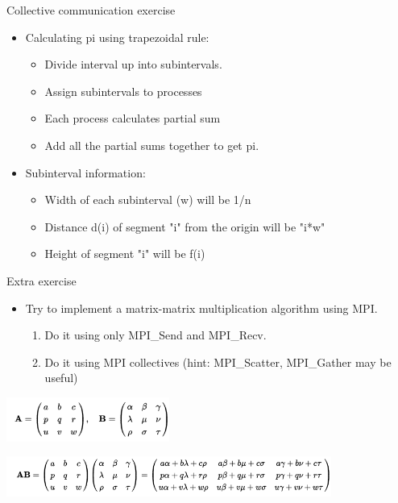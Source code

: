\begin{frame}[fragile]{Collective communication exercise}
\vspace{5mm}
\begin{itemize}
\item Calculating pi using trapezoidal rule:
    \begin{itemize}
    \item Divide interval up into subintervals.
    \item Assign subintervals to processes
    \item Each process calculates partial sum
    \item Add all the partial sums together to get pi.
    \end{itemize}
\vspace{5mm}    
\item Subinterval information:
    \begin{itemize}
    \item Width of each subinterval (w) will be 1/n
    \item Distance d(i) of segment "i" from the origin will be "i*w"
    \item Height of segment "i" will be f(i)
    \end{itemize}
\end{itemize}

\end{frame}

\begin{frame}{Extra exercise}
\begin{itemize}
\item Try to implement a matrix-matrix multiplication algorithm using MPI.
\begin{enumerate}
    \item Do it using only MPI\_Send and MPI\_Recv.
    \item Do it using MPI collectives (hint: MPI\_Scatter, MPI\_Gather may be useful)
\end{enumerate}
\end{itemize}
\vspace{5mm}    
\begin{center}
     \includegraphics[width=0.4\textwidth]{img/mm_1.png}
\end{center}

\begin{center}
     \includegraphics[width=0.8\textwidth]{img/mm_2.png}
\end{center}

\end{frame}


